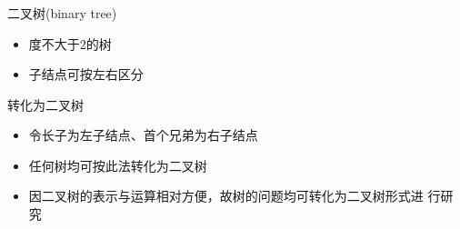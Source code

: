 \begin{fragile}
    \frametitle{\insertsectionhead}
    \begin{block}{二叉树(binary tree)}
        \begin{itemize}
            \item 度不大于$2$的树
            \item 子结点可按左右区分
        \end{itemize}
    \end{block}
    \begin{block}{转化为二叉树}
        \begin{itemize}
            \item 令长子为左子结点、首个兄弟为右子结点
            \item 任何树均可按此法转化为二叉树
            \item 因二叉树的表示与运算相对方便，故树的问题均可转化为二叉树形式进
                  行研究
        \end{itemize}
    \end{block}
\end{fragile}

